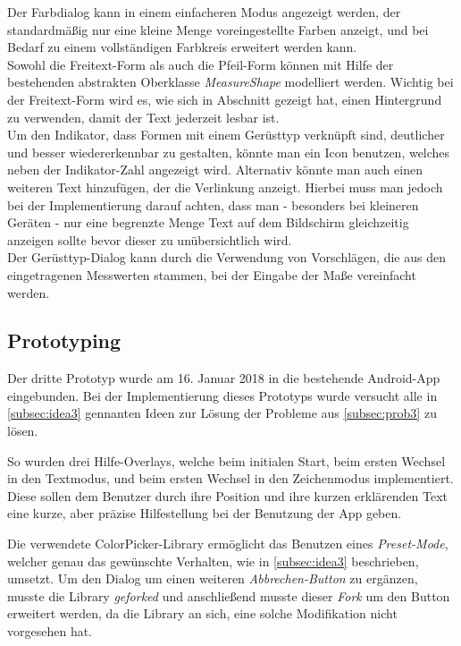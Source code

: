 Der Farbdialog kann in einem einfacheren Modus angezeigt werden, der standardmäßig nur eine kleine Menge voreingestellte Farben anzeigt, und bei Bedarf zu einem vollständigen Farbkreis erweitert werden kann. \\

Sowohl die Freitext-Form als auch die Pfeil-Form können mit Hilfe der bestehenden abstrakten Oberklasse \emph{MeasureShape} modelliert werden.
Wichtig bei der Freitext-Form wird es, wie sich in Abschnitt  gezeigt hat, einen Hintergrund zu verwenden, damit der Text jederzeit lesbar ist. \\

Um den Indikator, dass Formen mit einem Gerüsttyp verknüpft sind, deutlicher und besser wiedererkennbar zu gestalten, könnte man ein Icon benutzen, welches neben der Indikator-Zahl angezeigt wird.
Alternativ könnte man auch einen weiteren Text hinzufügen, der die Verlinkung anzeigt.
Hierbei muss man jedoch bei der Implementierung darauf achten, dass man - besonders bei kleineren Geräten - nur eine begrenzte Menge Text auf dem Bildschirm gleichzeitig anzeigen sollte bevor dieser zu unübersichtlich wird. \\

Der Gerüsttyp-Dialog kann durch die Verwendung von Vorschlägen, die aus den eingetragenen Messwerten stammen, bei der Eingabe der Maße vereinfacht werden. \\

\subsection{Prototyping}
Der dritte Prototyp wurde am 16. Januar 2018 in die bestehende Android-App eingebunden.
Bei der Implementierung dieses Prototyps wurde versucht alle in \autoref{subsec:idea3} gennanten Ideen zur Lösung der Probleme aus \autoref{subsec:prob3} zu lösen.

So wurden drei Hilfe-Overlays, welche beim initialen Start, beim ersten Wechsel in den Textmodus, und beim ersten Wechsel in den Zeichenmodus implementiert.
Diese sollen dem Benutzer durch ihre Position und ihre kurzen erklärenden Text eine kurze, aber präzise Hilfestellung bei der Benutzung der App geben.

Die verwendete ColorPicker-Library ermöglicht das Benutzen eines \emph{Preset-Mode}, welcher genau das gewünschte Verhalten, wie in \autoref{subsec:idea3} beschrieben, umsetzt.
Um den Dialog um einen weiteren \emph{Abbrechen-Button} zu ergänzen, musste die Library \emph{geforked} und anschließend musste dieser \emph{Fork} um den Button erweitert werden, da die Library an sich, eine solche Modifikation nicht vorgesehen hat. 

